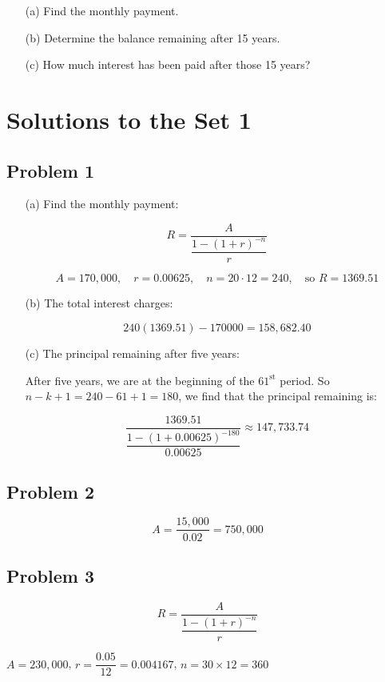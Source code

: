 \documentclass[12pt]{article}
\begin{document}
\begin{enumerate}
    \item[(a)] Find the monthly payment.
    \item[(b)] Determine the balance remaining after 15 years.
    \item[(c)] How much interest has been paid after those 15 years?
\end{enumerate}


\newpage
\section*{Solutions to the Set 1}
\subsection*{Problem 1}
\begin{enumerate}
    \item[(a)] Find the monthly payment:

    \[
    R = \dfrac{A}{\dfrac{1 - (1 + r)^{-n}}{r}}
    \]

    \[
    A = 170{,}000,\quad r = 0.00625,\quad n = 20 \cdot 12 = 240,\quad \text{so } R = \boxed{1369.51}
    \]

    \item[(b)] The total interest charges:

    \[
    240(1369.51) - 170000 = \boxed{158{,}682.40}
    \]

    \item[(c)] The principal remaining after five years:

    After five years, we are at the beginning of the \( 61^{\text{st}} \) period. So \( n - k + 1 = 240 - 61 + 1 = 180 \), we find that the principal remaining is:

    \[
    \dfrac{1369.51}{\dfrac{1 - (1 + 0.00625)^{-180}}{0.00625}} \approx \boxed{147{,}733.74}
    \]
\end{enumerate}
\subsection*{Problem 2}
\[
A = \dfrac{15{,}000}{0.02} = \boxed{750{,}000}
\]

\subsection*{Problem 3}
\[
R = \dfrac{A}{\dfrac{1 - (1 + r)^{-n}}{r}}
\]

\( A = 230{,}000 \), \( r = \dfrac{0.05}{12} = 0.004167 \), \( n = 30 \times 12 = 360 \)
\end{document}
